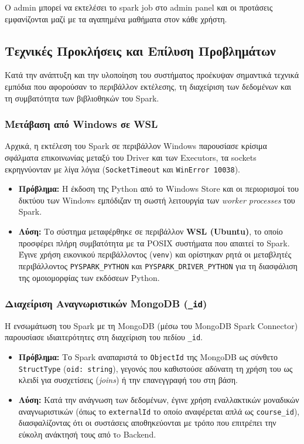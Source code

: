 \documentclass[a4paper,12pt]{article}
\begin{document}
Ο admin μπορεί να εκτελέσει το spark job στο admin panel και οι προτάσεις εμφανίζονται μαζί με τα αγαπημένα μαθήματα στον κάθε χρήστη.


\subsection{Τεχνικές Προκλήσεις και Επίλυση Προβλημάτων} 
Κατά την ανάπτυξη και την υλοποίηση του συστήματος προέκυψαν σημαντικά τεχνικά εμπόδια που αφορούσαν το περιβάλλον εκτέλεσης, τη διαχείριση των δεδομένων και τη συμβατότητα των βιβλιοθηκών του Spark.

\subsubsection{Μετάβαση από Windows σε WSL} 
Αρχικά, η εκτέλεση του Spark σε περιβάλλον Windows παρουσίασε κρίσιμα σφάλματα επικοινωνίας μεταξύ του Driver και των Executors, τα sockets εκρηγνύονταν με λίγα λόγια (\texttt{SocketTimeout} και \texttt{WinError 10038}). 

\begin{itemize} 
    \item \textbf{Πρόβλημα:} Η έκδοση της Python από το Windows Store και οι περιορισμοί του δικτύου των Windows εμπόδιζαν τη σωστή λειτουργία των \textit{worker processes} του Spark. 
    
    \item \textbf{Λύση:} Το σύστημα μεταφέρθηκε σε περιβάλλον \textbf{WSL (Ubuntu)}, το οποίο προσφέρει πλήρη συμβατότητα με τα POSIX συστήματα που απαιτεί το Spark. Έγινε χρήση εικονικού περιβάλλοντος (\texttt{venv}) και ορίστηκαν ρητά οι μεταβλητές περιβάλλοντος \texttt{PYSPARK\_PYTHON} και \texttt{PYSPARK\_DRIVER\_PYTHON} για τη διασφάλιση της ομοιομορφίας των εκδόσεων Python. 
\end{itemize}

\subsubsection{Διαχείριση Αναγνωριστικών MongoDB (\texttt{\_id})}
Η ενσωμάτωση του Spark με τη MongoDB (μέσω του MongoDB Spark Connector) παρουσίασε ιδιαιτερότητες στη διαχείριση του πεδίου \texttt{_id}. 

\begin{itemize} 
    \item \textbf{Πρόβλημα:} Το Spark αναπαριστά το \texttt{ObjectId} της MongoDB ως σύνθετο \texttt{StructType} (\texttt{{oid: string}}), γεγονός που καθιστούσε αδύνατη τη χρήση του ως κλειδί για συσχετίσεις (\textit{joins}) ή την επανεγγραφή του στη βάση. 
    
    \item \textbf{Λύση:} Κατά την ανάγνωση των δεδομένων, έγινε χρήση εναλλακτικών μοναδικών αναγνωριστικών (όπως το \texttt{externalId} το οποίο αναφέρεται απλά ως \texttt{course\_id}), διασφαλίζοντας ότι οι συστάσεις αποθηκεύονται με τρόπο που επιτρέπει την εύκολη ανάκτησή τους από τo Backend. 
\end{itemize}
\end{document}
